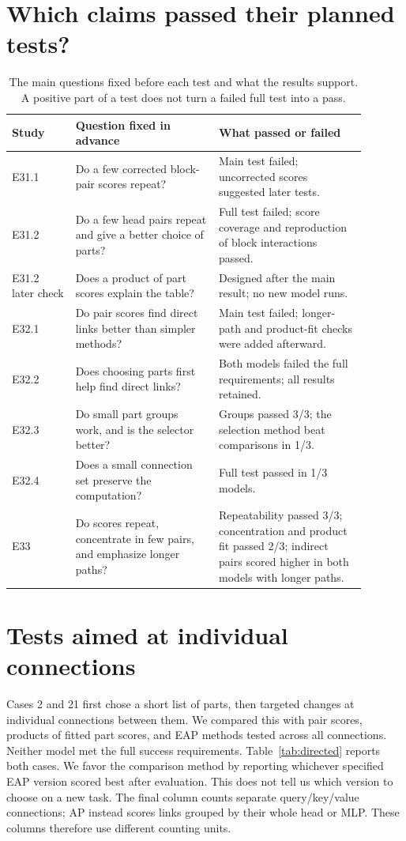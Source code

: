 \documentclass[11pt]{article}
\begin{document}
\appendix
\section{Which claims passed their planned tests?}
\begin{table}[htbp]
\centering\small
\caption{The main questions fixed before each test and what the results support.
A positive part of a test does not turn a failed full test into a pass.}
\begin{tabular}{p{0.16\linewidth}p{0.36\linewidth}p{0.37\linewidth}}
\toprule
Study & Question fixed in advance & What passed or failed\\
\midrule
E31.1 & Do a few corrected block-pair scores repeat? & Main test failed;
uncorrected scores suggested later tests.\\
E31.2 & Do a few head pairs repeat and give a better choice of parts? & Full
test failed; score coverage and reproduction of block interactions passed.\\
E31.2 later check & Does a product of part scores explain the table? & Designed
after the main result; no new model runs.\\
E32.1 & Do pair scores find direct links better than simpler methods? & Main
test failed; longer-path and product-fit checks were added afterward.\\
E32.2 & Does choosing parts first help find direct links? & Both models failed
the full requirements; all results retained.\\
E32.3 & Do small part groups work, and is the selector better? & Groups passed
3/3; the selection method beat comparisons in 1/3.\\
E32.4 & Does a small connection set preserve the computation? & Full test
passed in 1/3 models.\\
E33 & Do scores repeat, concentrate in few pairs, and emphasize longer paths? &
Repeatability passed 3/3; concentration and product fit passed 2/3;
indirect pairs scored higher in both models with longer paths.\\
\bottomrule
\end{tabular}
\end{table}

\section{Tests aimed at individual connections}
Cases 2 and 21 first chose a short list of parts, then targeted changes at
individual connections between them. We compared this with pair scores,
products of fitted part scores, and EAP methods tested across all connections.
Neither model met the full success requirements. Table~\ref{tab:directed}
reports both cases. We favor the comparison method by reporting whichever
specified EAP version scored best after evaluation. This does not tell us
which version to choose on a new task. The final column counts separate
query/key/value connections; AP instead scores links grouped by their whole
head or MLP. These columns therefore use different counting units.
\end{document}
